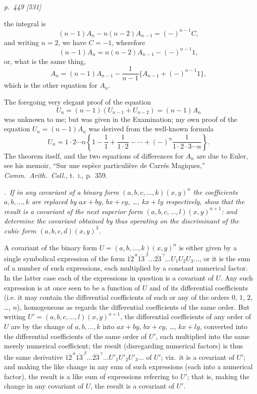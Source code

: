 \documentclass[11pt,a4paper]{article}
\theoremstyle{plain}
\theoremstyle{definition}
\begin{document}
\clearpage

\bigskip
\textit{p.~449 [531]}
\smallskip

the integral is
\[
(n-1)A_n-n(n-2)A_{n-1}=(-)^{n-1}C,
\]
and writing $n=2$, we have $C=-1$, wherefore
\[
(n-1)A_n=n(n-2)A_{n-1}-(-)^{n-1}1,
\]
or, what is the same thing,
\[
A_n=(n-1)A_{n-1}-\frac{1}{n-1}\{A_{n-1}+(-)^{n-1}1\},
\]
which is the other equation for $A_n$.

The foregoing very elegant proof of the equation
\[
U_n=(n-1)(U_{n-1}+U_{n-2})=(n-1)A_n
\]
was unknown to me; but was given in the Examination; my own proof of the
equation $U_n=(n-1)A_n$ was derived from the well-known formula
\[
U_n=1\cdot2\cdots n\left\{1-\frac{1}{1}+\frac{1}{1\cdot2}-\cdots+(-)^n\frac{1}{1\cdot2\cdot3\cdots n}\right\}.
\]
The theorem itself, and the two equations of differences for $A_n$ are due to Euler, see
his memoir, ``Sur une esp\`ece particuli\`ere de Carr\'es Magiques,'' \textit{Comm.\ Arith.\ Coll.}, t.~\textsc{i}.,
p.~359.

\medskip
{}.\ \textit{If in any covariant of a binary form $(a, b, c, \ldots, k)(x, y)^n$ the coefficients
$a, b, \ldots, k$ are replaced by $ax + by$, $bx + cy$, \ldots, $kx + ly$ respectively, show that the result is
a covariant of the next superior form $(a, b, c, \ldots, l)(x, y)^{n+1}$: and determine the covariant
obtained by thus operating on the discriminant of the cubic form $(a, b, c, d)(x, y)^3$.}

\medskip

A covariant of the binary form $U=(a, b, \ldots, k)(x, y)^n$ is either given by a single
symbolical expression of the form $\overline{12}^{\,a}\overline{13}^{\,\beta}\ldots
\overline{23}^{\,\gamma}\ldots U_1U_2U_3\ldots$, or it is the sum of a
number of such expressions, each multiplied by a constant numerical factor. In the
latter case each of the expressions in question is a covariant of $U$. Any such
expression is at once seen to be a function of $U$ and of its differential coefficients
(i.e. it may contain the differential coefficients of each or any of the orders $0$, $1$, $2$, \ldots, $n$),
homogeneous as regards the differential coefficients of the same order. But writing
$U'=(a, b, c, \ldots, l)(x, y)^{n+1}$, the differential coefficients of any order of $U$ are by the
change of $a, b, \ldots, k$ into $ax+by$, $bx+cy$, \ldots, $kx+ly$, converted into the differential
coefficients of the same order of $U'$, each multiplied into the same merely numerical
coefficient; the result (disregarding numerical factors) is thus the same derivative
$\overline{12}^{\,a}\overline{13}^{\,\beta}\ldots\overline{23}^{\,\gamma}\ldots U'_1U'_2U'_3\ldots$
of $U'$; viz.\ it is a covariant of $U'$; and making the like change in any sum of
such expressions (each into a numerical factor), the result is a like sum of expressions
referring to $U'$; that is, making the change in any covariant of $U$, the result is a
covariant of $U'$.
\end{document}
